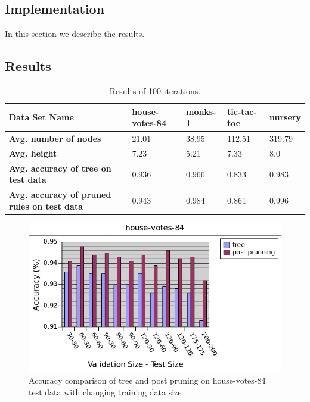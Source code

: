 \documentclass[12pt]{article}
\begin{document}
\subsection{Implementation}
In this section we describe the results.

\subsection{Results}
\begin{table}[H]
  \centering
  \begin{small}
    \begin{tabular}{|l|l|l|l|l|}
      \hline
      \textbf{Data Set Name}                           & house-votes-84 & monks-1 & tic-tac-toe & nursery \\ \hline
      \textbf{Avg. number of nodes}                           & 21.01                   & 38.95            & 112.51               & 319.79           \\ \hline
      \textbf{Avg. height}                                & 7.23                    & 5.21             & 7.33                 & 8.0                \\ \hline
      \textbf{Avg. accuracy of tree on test data}         & 0.936                   & 0.966            & 0.833                & 0.983            \\ \hline
      \textbf{Avg. accuracy of pruned rules on test data} & 0.943                   & 0.984            & 0.861                & 0.996            \\ \hline
    \end{tabular}
\end{small}
\caption{Results of 100 iterations.}
\label{table:performance}
\end{table}

\begin{figure}[H]
  \centering
  \includegraphics[scale=0.5]{img/house-votes-84-comparison}
  \caption{Accuracy comparison of tree and post pruning on house-votes-84 test data with changing training data size}
  \label{fig:house-comp}
\end{figure}
\end{document}
